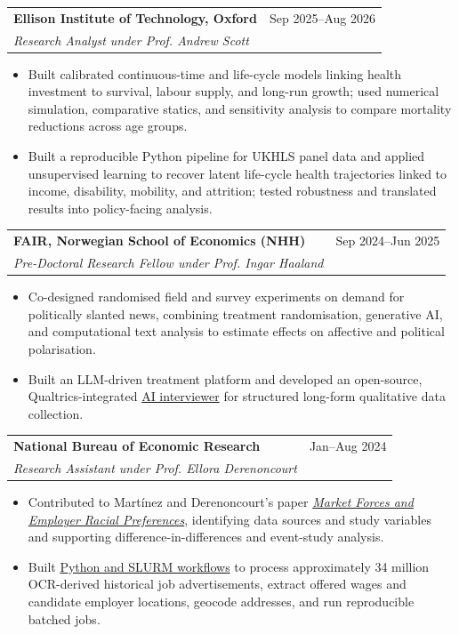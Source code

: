 \documentclass[10pt,letterpaper]{article}
\makeatletter
\newcommand{\cvrole}[4]{%
  \begin{tabularx}{\textwidth}{@{}>{\raggedright\arraybackslash}X>{\raggedleft\arraybackslash}p{1.5in}@{}}
    \textbf{\color{ink}#1} & \small{#2} \\
    \textit{#3} & \hfill\makebox[0pt][r]{\textit{\small{#4}}}
  \end{tabularx}
  \vspace{0pt}
}
\newcommand{\rolebreak}{\vspace{8pt}}
\makeatother
\begin{document}
\cvrole{Ellison Institute of Technology, Oxford}{Sep 2025--Aug 2026}{Research Analyst under Prof. Andrew Scott}{Oxford, UK}
\begin{itemize}
  \item Built calibrated continuous-time and life-cycle models linking health investment to survival, labour supply, and long-run growth; used numerical simulation, comparative statics, and sensitivity analysis to compare mortality reductions across age groups.
  \item Built a reproducible Python pipeline for UKHLS panel data and applied unsupervised learning to recover latent life-cycle health trajectories linked to income, disability, mobility, and attrition; tested robustness and translated results into policy-facing analysis.
\end{itemize}
\rolebreak

\cvrole{FAIR, Norwegian School of Economics (NHH)}{Sep 2024--Jun 2025}{Pre-Doctoral Research Fellow under Prof. Ingar Haaland}{Bergen, Norway}
\begin{itemize}
  \item Co-designed randomised field and survey experiments on demand for politically slanted news, combining treatment randomisation, generative AI, and computational text analysis to estimate effects on affective and political polarisation.
  \item Built an LLM-driven treatment platform and developed an open-source, Qualtrics-integrated \href{https://github.com/mkmacho/ai-qualitative-interviews}{AI interviewer} for structured long-form qualitative data collection.
\end{itemize}
\rolebreak

\cvrole{National Bureau of Economic Research}{Jan--Aug 2024}{Research Assistant under Prof. Ellora Derenoncourt}{Cambridge, MA, USA / Princeton, NJ, USA}
\begin{itemize}
  \item Contributed to Mart\'inez and Derenoncourt's paper \href{https://joanjmartinez.nyc3.digitaloceanspaces.com/research/JMartinez_JMP_MarketForces_2025.pdf}{\textit{Market Forces and Employer Racial Preferences}}, identifying data sources and study variables and supporting difference-in-differences and event-study analysis.
  \item Built \href{https://github.com/mkmacho/newslabor-extract}{Python and SLURM workflows} to process approximately 34 million OCR-derived historical job advertisements, extract offered wages and candidate employer locations, geocode addresses, and run reproducible batched jobs.
\end{itemize}
\rolebreak
\end{document}
